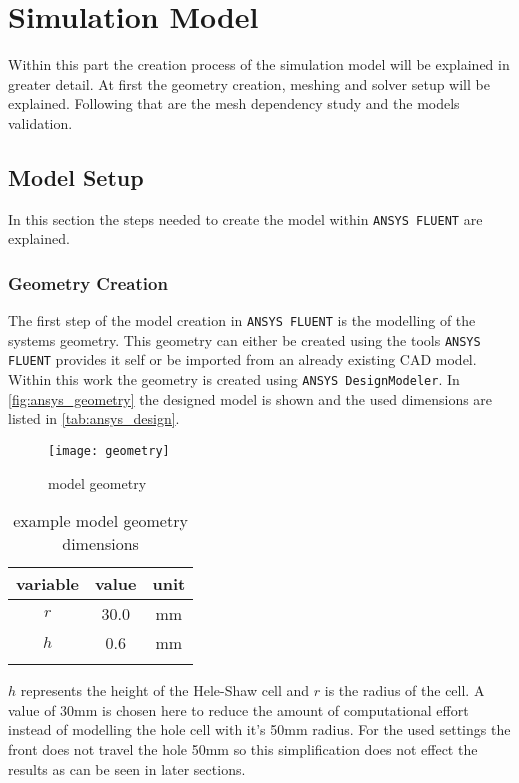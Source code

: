 \documentclass[../thesis.tex]{subfiles}
\begin{document}
\chapter{Simulation Model}
\label{chp:model}

Within this part the creation process of the simulation model will be explained in greater detail. At first the geometry creation, meshing and solver setup will be explained. Following that are the mesh dependency study and the models validation.

\section{Model Setup}
\label{sec:mod_setup}
In this section the steps needed to create the model within \texttt{ANSYS FLUENT} are explained.

\subsection{Geometry Creation}
The first step of the model creation in \texttt{ANSYS FLUENT} is the modelling of the systems geometry. This geometry can either be created using the tools \texttt{ANSYS FLUENT} provides it self or be imported from an already existing CAD model. Within this work the geometry is created using \texttt{ANSYS DesignModeler}. In \autoref{fig:ansys_geometry} the designed model is shown and the used dimensions are listed in \autoref{tab:ansys_design}.
\begin{figure}[htbp]
	\centering
	\texttt{[image: geometry]}
	\caption{model geometry}
	\label{fig:ansys_geometry}
\end{figure}
\begin{table} [htb]
	\centering
	\caption{example model geometry dimensions}
	\begin{tabular}{ ccc }
		\hline
		variable & value & unit \\
		\hline
		$r$ & 30.0 & mm \\
		$h$ & 0.6 & mm \\
		\hline
		\label{tab:ansys_design}
	\end{tabular}
\end{table}

$h$ represents the height of the Hele-Shaw cell and $r$ is the radius of the cell. A value of 30mm is chosen here to reduce the amount of computational effort instead of modelling the hole cell with it's 50mm radius. For the used settings the front does not travel the hole 50mm so this simplification does not effect the results as can be seen in later sections.
\end{document}
